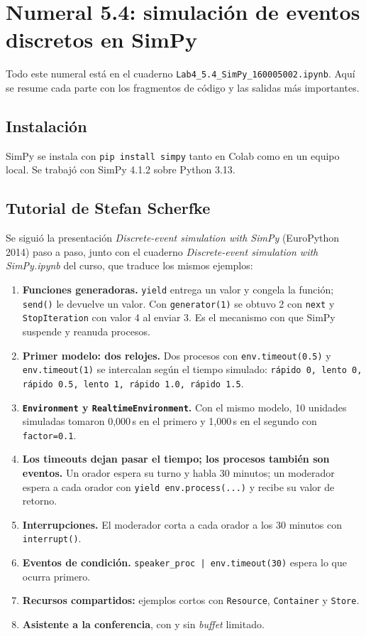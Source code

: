 \documentclass[11pt,letterpaper]{article}
\newcommand{\codigoEstudiante}{160005002}
\begin{document}
\section{Numeral 5.4: simulación de eventos discretos en SimPy}

Todo este numeral está en el cuaderno \texttt{Lab4\_5.4\_SimPy\_\codigoEstudiante.ipynb}. Aquí se resume cada
parte con los fragmentos de código y las salidas más importantes.

\subsection{Instalación}

SimPy se instala con \texttt{pip install simpy} tanto en Colab como en un equipo local. Se trabajó con SimPy
4.1.2 sobre Python 3.13.

\subsection{Tutorial de Stefan Scherfke}

Se siguió la presentación \emph{Discrete-event simulation with SimPy} (EuroPython 2014) paso a paso, junto con el
cuaderno \emph{Discrete-event simulation with SimPy.ipynb} del curso, que traduce los mismos ejemplos:

\begin{enumerate}[itemsep=2pt]
\item \textbf{Funciones generadoras.} \texttt{yield} entrega un valor y congela la función; \texttt{send()} le
devuelve un valor. Con \texttt{generator(1)} se obtuvo 2 con \texttt{next} y \texttt{StopIteration} con valor 4
al enviar 3. Es el mecanismo con que SimPy suspende y reanuda procesos.
\item \textbf{Primer modelo: dos relojes.} Dos procesos con \texttt{env.timeout(0.5)} y \texttt{env.timeout(1)} se
intercalan según el tiempo simulado: \texttt{rápido 0, lento 0, rápido 0.5, lento 1, rápido 1.0, rápido 1.5}.
\item \textbf{\texttt{Environment} y \texttt{RealtimeEnvironment}.} Con el mismo modelo, 10 unidades simuladas
tomaron 0,000\,s en el primero y 1,000\,s en el segundo con \texttt{factor=0.1}.
\item \textbf{Los timeouts dejan pasar el tiempo; los procesos también son eventos.} Un orador espera su turno
y habla 30 minutos; un moderador espera a cada orador con \texttt{yield env.process(...)} y recibe su valor de
retorno.
\item \textbf{Interrupciones.} El moderador corta a cada orador a los 30 minutos con \texttt{interrupt()}.
\item \textbf{Eventos de condición.} \texttt{speaker\_proc | env.timeout(30)} espera lo que ocurra primero.
\item \textbf{Recursos compartidos:} ejemplos cortos con \texttt{Resource}, \texttt{Container} y \texttt{Store}.
\item \textbf{Asistente a la conferencia}, con y sin \emph{buffet} limitado.
\end{enumerate}
\end{document}
